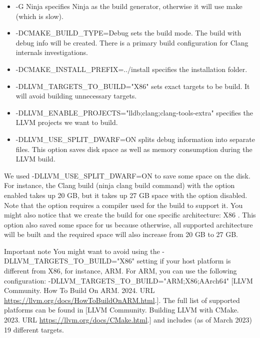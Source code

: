 \begin{itemize}
\item
-G Ninja specifies Ninja as the build generator, otherwise it will use make (which is slow).

\item
-DCMAKE\_BUILD\_TYPE=Debug sets the build mode. The build with debug info will be created. There is a primary build configuration for Clang internals investigations.

\item
-DCMAKE\_INSTALL\_PREFIX=../install specifies the installation folder.

\item
-DLLVM\_TARGETS\_TO\_BUILD="X86" sets exact targets to be build. It will avoid building unnecessary targets.

\item
-DLLVM\_ENABLE\_PROJECTS="lldb;clang;clang-tools-extra" specifies the LLVM projects we want to build.

\item
-DLLVM\_USE\_SPLIT\_DWARF=ON splits debug information into separate files. This option saves disk space as well as memory consumption during the LLVM build.
\end{itemize}

We used -DLLVM\_USE\_SPLIT\_DWARF=ON to save some space on the disk. For instance, the Clang build (ninja clang build command) with the option enabled takes up 20 GB, but it takes up 27 GB space with the option disabled. Note that the option requires a compiler used for the build to support it. You might also notice that we create the build for one specific architecture: X86 . This option also saved some space for us because otherwise, all supported architecture will be built and the required space will also increase from 20 GB to 27 GB.

\begin{myNotic}{Important note}
You might want to avoid using the -DLLVM\_TARGETS\_TO\_BUILD="X86" setting if your host platform is different from X86, for instance, ARM. For ARM, you can use the following configuration: -DLLVM\_TARGETS\_TO\_BUILD="ARM;X86;AArch64" [LLVM Community. How To Build On ARM. 2024. URL \url{https://llvm.org/docs/HowToBuildOnARM.html}.]. The full list of supported platforms can be found in [LLVM Community. Building LLVM with CMake. 2023. URL \url{https://llvm.org/docs/CMake.html}.] and includes (as of March 2023) 19 different targets.
\end{myNotic}


